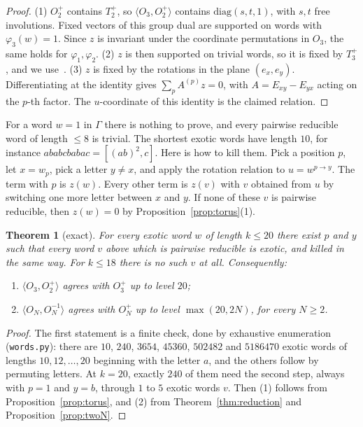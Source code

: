 \documentclass[11pt]{amsart}
\newtheorem{theorem}{Theorem}[section]
\theoremstyle{definition}
\theoremstyle{remark}
\theoremstyle{plain}
\numberwithin{equation}{section}
\numberwithin{table}{section}
\begin{document}
\begin{proof}
(1) $O_2^+$ contains $T_2^+$, so $\langle O_3,O_2^+\rangle$ contains $\mathrm{diag}(s,t,1)$, with $s,t$ free involutions.
Fixed vectors of this group dual are supported on words with $\varphi_3(w)=1$. Since $z$ is invariant under the coordinate
permutations in $O_3$, the same holds for $\varphi_1,\varphi_2$. (2) $z$ is then supported on trivial words, so it is fixed by
$T_3^+$, and we use~\cite[Theorem~3.3]{ch2}. (3) $z$ is fixed by the rotations in the plane $(e_x,e_y)$. Differentiating at
the identity gives $\sum_pA^{(p)}z=0$, with $A=E_{xy}-E_{yx}$ acting on the $p$-th factor. The $u$-coordinate of this
identity is the claimed relation.
\end{proof}

For a word $w=1$ in $\Gamma$ there is nothing to prove, and every pairwise reducible word of length $\le8$ is trivial. The
shortest exotic words have length $10$, for instance $ababcbabac=[(ab)^2,c]$. Here is how to kill them. Pick a position
$p$, let $x=w_p$, pick a letter $y\neq x$, and apply the rotation relation to $u=w^{p\to y}$. The term with $p$ is $z(w)$.
Every other term is $z(v)$ with $v$ obtained from $u$ by switching one more letter between $x$ and $y$. If none of these $v$ is
pairwise reducible, then $z(w)=0$ by Proposition~\ref{prop:torus}(1).

\begin{theorem}[exact]\label{thm:sixteen}
For every exotic word $w$ of length $k\le20$ there exist $p$ and $y$ such that every word $v$ above which is pairwise
reducible is exotic, and killed in the same way. For $k\le18$ there is no such $v$ at all. Consequently:
\begin{enumerate}
\item $\langle O_3,O_2^+\rangle$ agrees with $O_3^+$ up to level $20$;
\item $\langle O_N,O_N^{-1}\rangle$ agrees with $O_N^+$ up to level $\max(20,2N)$, for every $N\ge2$.
\end{enumerate}
\end{theorem}

\begin{proof}
The first statement is a finite check, done by exhaustive enumeration (\texttt{words.py}): there are $10$, $240$, $3654$, $45360$, $502482$ and $5186470$ exotic words
of lengths $10,12,\dots,20$ beginning with the letter $a$, and the others follow by permuting letters. At $k=20$, exactly $240$ of them need the second step, always with $p=1$ and $y=b$, through $1$ to $5$ exotic words $v$. Then (1) follows from
Proposition~\ref{prop:torus}, and (2) from Theorem~\ref{thm:reduction} and Proposition~\ref{prop:twoN}.
\end{proof}
\end{document}
